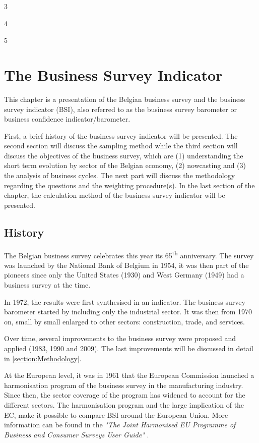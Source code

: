 \documentclass[12pt,a4paper,oneside]{book}
\begin{document}
3

4

5


\chapter{The Business Survey Indicator}

This chapter is a presentation of the Belgian business survey and the business survey indicator (BSI), also referred to as the business survey barometer or business confidence indicator/barometer.

First, a brief history of the business survey indicator will be presented.
The second section will discuss the sampling method while the third section will discuss the objectives of the business survey, which are (1) understanding the short term evolution by sector of the Belgian economy, (2) nowcasting and (3) the analysis of business cycles.
The next part will discuss the methodology regarding the questions and the weighting procedure(s).
In the last section of the chapter, the calculation method of the business survey indicator will be presented.


\section{History}

The Belgian business survey celebrates this year its 65\textsuperscript{th} anniversary. The survey was launched by the National Bank of Belgium in 1954, it was then part of the pioneers since only the United States (1930) and West Germany (1949) had a business survey at the time.

In 1972, the results were first synthesised in an indicator.
The business survey barometer started by including only the industrial sector. It was then from 1970 on, small by small enlarged to other sectors: construction, trade, and services. 

Over time, several improvements to the business survey were proposed and applied (1983, 1990 and 2009). The last improvements will be discussed in detail in \autoref{section:Methodology}.

At the European level, it was in 1961 that the European Commission launched a harmonisation program of the business survey in the manufacturing industry. 
Since then, the sector coverage of the program has widened to account for the different sectors.
The harmonisation program and the large implication of the EC, make it possible to compare BSI around the European Union.
More information can be found in the \textit{"The Joint Harmonised EU Programme of Business and Consumer Surveys User Guide"} \cite{european_commission_joint_2016}.
\end{document}
